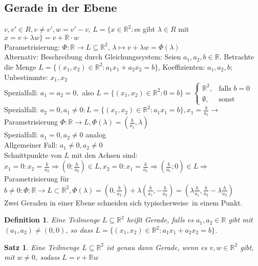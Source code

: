 \documentclass[12pt,a4paper]{article}
\theoremstyle{plain}
\newtheorem{Satz}[Theorem]{Satz}
\newtheorem{Definition}[Theorem]{Definition}
\newcommand{\R}{\mathbb{R}}
\numberwithin{equation}{section}
\begin{document}
\subsection{Gerade in der Ebene}
$v,v'\in R, v\neq v', w=v'-v$, $L=\{x\in \R^2:$es gibt $\lambda\in R$ mit $x=v+\lambda w\}=v+\R\cdot w$\\
Parametrisierung: $\Phi:\R \rightarrow L\subseteq \R^2$, $\lambda \mapsto v+\lambda w=\Phi(\lambda)$\\
Alternativ: Beschreibung durch Gleichungssystem: Seien $a_1, a_2, b\in \R$. Betrachte die Menge $L=\{(x_1,x_2)\in\R^2:a_1 x_1+a_2 x_2=b\}$, Koeffizienten: $a_1, a_2, b$; Unbestimmte: $x_1, x_2$\\
Spezialfall: $a_1=a_2=0,$ also $L=\{(x_1,x_2)\in\R^2:0=b\}=\left\lbrace \begin{array}{ll} \R^2,&\text{falls }b=0\\ \emptyset,&\text{sonst}
\end{array}\right.$\\
Spezialfall: $a_2=0,a_1\neq 0: L=\{(x_1,x_2)\in\R^2:a_1 x_1=b\}, x_1=\frac{b}{a_1} \rightarrow$ Parametrisierung $\Phi: \R \rightarrow L, \Phi(\lambda)=\left(\frac{b}{a_1},\lambda\right)$\\
Spezialfall: $a_1=0,a_2\neq 0$ analog\\
\glqq Allgemeiner Fall\grqq: $a_1\neq 0, a_2\neq 0$\\
Schnittpunkte von $L$ mit den Achsen sind: $x_1=0:x_2=\frac{b}{a_2} \Rightarrow \left(0;\frac{b}{a_2}\right)\in L, x_2=0: x_1=\frac{b}{a_1} \Rightarrow \left(\frac{b}{a_1};0\right)\in L \Rightarrow$ Parametrisierung für $b\neq 0: \Phi: \R \rightarrow L \subset \R^2, \Phi(\lambda)=\left(0,\frac{b}{a_2}\right)+\lambda\left(\frac{b}{a_1},-\frac{b}{a_2} \right)= \left(\lambda\frac{b}{a_1},\frac{b}{a_2}-\lambda\frac{b}{a_2}\right)$\\
Zwei Geraden in einer Ebene schneiden sich \glqq typischerweise\grqq\ in einem Punkt.
\begin{Definition}
Eine Teilmenge $L\subseteq \R^2$ heißt Gerade, falls es $a_1,a_2\in \R$ gibt mit $(a_1,a_2)\neq(0,0)$, so dass $L=\{(x_1,x_2)\in\R^2:a_1 x_1+ a_2 x_2=b\}$.
\end{Definition}
\begin{Satz}
Eine Teilmenge $L\subseteq\R^2$ ist genau dann Gerade, wenn es $v,w\in\R^2$ gibt, mit $w\neq 0$, sodass $L=v+\R w$
\end{Satz}
\end{document}
